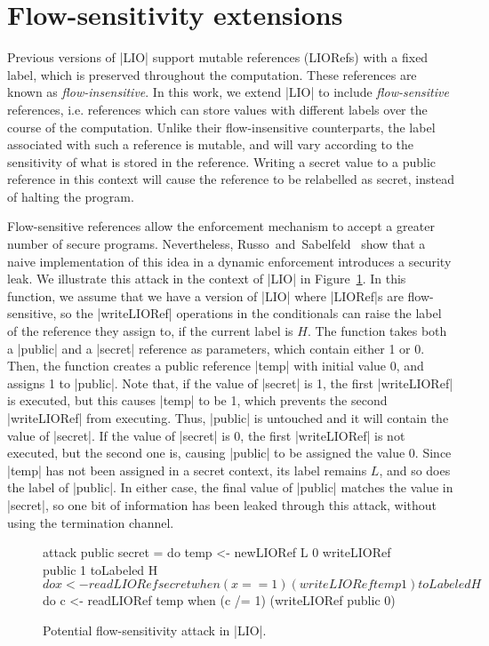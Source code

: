 \section{Flow-sensitivity extensions}

Previous versions of |LIO| support mutable references (LIORefs) with a
fixed label, which is preserved throughout the computation. These
references are known as \emph{flow-insensitive}. In this work, we
extend |LIO| to include \emph{flow-sensitive} references,
i.e. references which can store values with different labels over the
course of the computation. Unlike their flow-insensitive counterparts,
the label associated with such a reference is mutable, and will vary
according to the sensitivity of what is stored in the
reference. Writing a secret value to a public reference in this
context will cause the reference to be relabelled as secret, instead
of halting the program.

Flow-sensitive references allow the enforcement mechanism to accept a
greater number of secure programs. Nevertheless,
Russo~and~Sabelfeld~\citep{?} show that a naive implementation of this
idea in a dynamic enforcement introduces a security leak. We
illustrate this attack in the context of |LIO| in
Figure~\ref{fig:fs-attack}. In this function, we assume that we have a
version of |LIO| where |LIORef|s are flow-sensitive, so the
|writeLIORef| operations in the conditionals can raise the label of
the reference they assign to, if the current label is $H$. The
function takes both a |public| and a |secret| reference as parameters,
which contain either 1 or 0. Then, the function creates a public
reference |temp| with initial value 0, and assigns 1 to |public|.
Note that, if the value of |secret| is 1, the first |writeLIORef| is
executed, but this causes |temp| to be 1, which prevents the second
|writeLIORef| from executing. Thus, |public| is untouched and it will
contain the value of |secret|. If the value of |secret| is 0, the
first |writeLIORef| is not executed, but the second one is, causing
|public| to be assigned the value 0. Since |temp| has not been
assigned in a secret context, its label remains $L$, and so does the
label of |public|. In either case, the final value of |public| matches
the value in |secret|, so one bit of information has been leaked
through this attack, without using the termination channel.

\begin{figure}[!ht]
\vspace*{-5pt}
\begin{code}
attack public secret = 
  do  temp    <- newLIORef L 0
      writeLIORef public 1
      toLabeled H $ do  x <- readLIORef secret
                        when (x == 1) (writeLIORef temp 1)
      toLabeled H $ do  c <- readLIORef temp
                        when (c /= 1) (writeLIORef public 0)
\end{code}
\caption{Potential flow-sensitivity attack in |LIO|.\label{fig:fs-attack}}
\vspace*{-5pt}
\end{figure}

